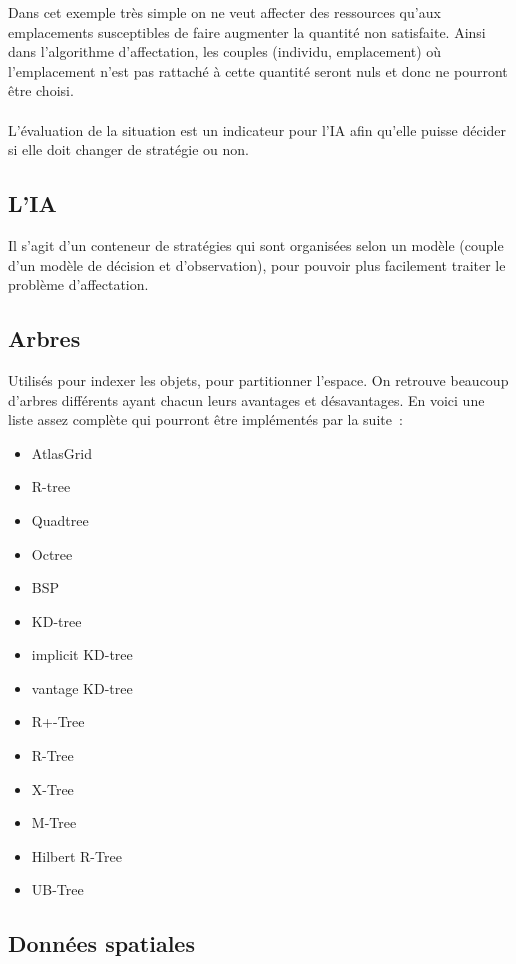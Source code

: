 Dans cet exemple très simple on ne veut affecter des ressources qu'aux emplacements susceptibles de faire augmenter la quantité non satisfaite. Ainsi dans l'algorithme d'affectation, les couples (individu, emplacement) où l'emplacement n'est pas rattaché à cette quantité seront nuls et donc ne pourront être choisi.\\\\
L'évaluation de la situation est un indicateur pour l'IA afin qu'elle puisse décider si elle doit changer de stratégie ou non.


\subsection{L'IA}

Il s'agit d'un conteneur de stratégies qui sont organisées selon un modèle (couple d'un modèle de décision et d'observation), pour pouvoir plus facilement traiter le problème d'affectation.

\subsection{Arbres}

Utilisés pour indexer les objets, pour partitionner l'espace. On retrouve beaucoup d'arbres différents ayant chacun leurs avantages et désavantages. En voici une liste assez complète qui pourront être implémentés par la suite~:
\begin{itemize}
\item AtlasGrid
\item R-tree
\item Quadtree
\item Octree
\item BSP
\item KD-tree
\item implicit KD-tree
\item vantage KD-tree
\item R+-Tree
\item R-Tree
\item X-Tree
\item M-Tree
\item Hilbert R-Tree
\item UB-Tree
\end{itemize}

\subsection{Données spatiales}

